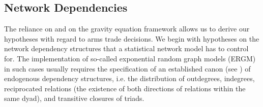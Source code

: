 \documentclass[12pt, letterpaper]{article}
\numberwithin{equation}{section}
\begin{document}
\subsection{Network Dependencies}
The reliance on \cite{Levietal:94} and on the gravity equation framework allows us to derive our hypotheses with regard to arms trade decisions.
We begin with hypotheses on the network dependency structures that a statistical network model has to control for. The implementation of so-called exponential random graph models (ERGM) in such cases usually requires the specification of an established canon (see \cite{art:Snijders2011, Cranmer-etal.17}) of endogenous dependency structures, i.e. the distribution of outdegrees, indegrees, reciprocated relations (the existence of both directions of relations within the same dyad), and transitive closures of triads. 
\end{document}
